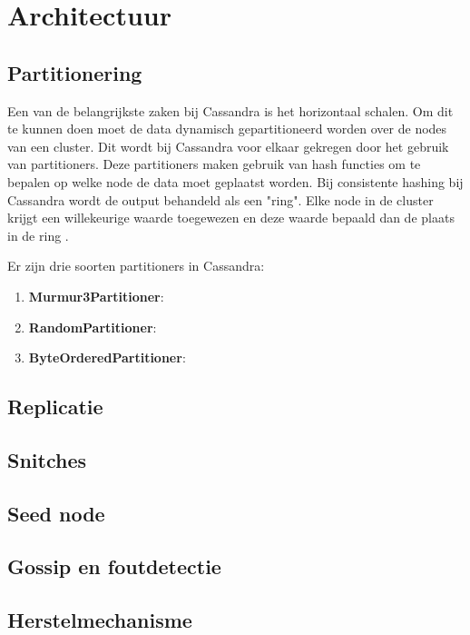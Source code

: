 \chapter{Architectuur}
\label{ch:cassandra_architectuur}

\section{Partitionering}
Een van de belangrijkste zaken bij Cassandra is het horizontaal schalen.
Om dit te kunnen doen moet de data dynamisch gepartitioneerd worden over de nodes van een cluster.
Dit wordt bij Cassandra voor elkaar gekregen door het gebruik van partitioners.
Deze partitioners maken gebruik van hash functies om te bepalen op welke node de data moet geplaatst worden.
Bij consistente hashing bij Cassandra wordt de output behandeld als een "ring".
Elke node in de cluster krijgt een willekeurige waarde toegewezen en deze waarde bepaald dan de plaats in de ring \citep{lakshman2010cassandra}.


Er zijn drie soorten partitioners in Cassandra:

\begin{enumerate}
	\item \textbf{Murmur3Partitioner}:
	
	
	\item \textbf{RandomPartitioner}:
	\item \textbf{ByteOrderedPartitioner}:
\end{enumerate}

\section{Replicatie}
\section{Snitches}
\section{Seed node}
\section{Gossip en foutdetectie}
\section{Herstelmechanisme}
